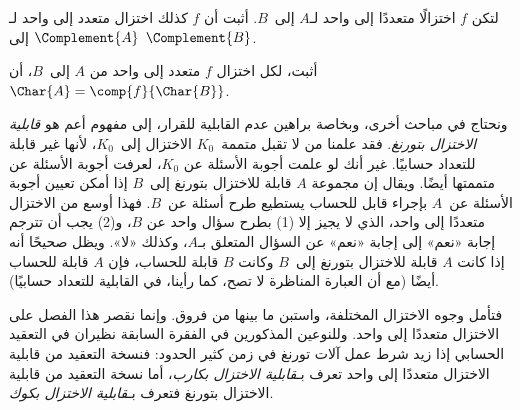 \documentclass[../../../include/open-logic-section]{subfiles}
\begin{document}
\begin{prob}
لتكن $f$ اختزالًا متعددًا إلى واحد لـ$A$ إلى~$B$. أثبت أن $f$ كذلك
اختزال متعدد إلى واحد لـ$\Complement{A}$ إلى $\Complement{B}$.
\end{prob}

\begin{prob}
أثبت، لكل اختزال $f$ متعدد إلى واحد من $A$ إلى~$B$، أن
$\Char{A}=\comp{f}{\Char{B}}$.
\end{prob}

\begin{digress}
ونحتاج في مباحث أخرى، وبخاصة براهين عدم القابلية للقرار، إلى مفهوم
أعم هو \emph{قابلية الاختزال بتورنغ}. فقد علمنا من
 لا تقبل متممة~$K_0$ الاختزال إلى~$K_0$، لأنها
غير قابلة للتعداد حسابيًا. غير أنك لو علمت أجوبة الأسئلة عن
$K_0$، لعرفت أجوبة الأسئلة عن متممتها أيضًا. ويقال إن مجموعة $A$
قابلة للاختزال بتورنغ إلى~$B$ إذا أمكن تعيين أجوبة الأسئلة عن~$A$
بإجراء قابل للحساب يستطيع طرح أسئلة عن~$B$. فهذا أوسع من
الاختزال متعددًا إلى واحد، الذي لا يجيز إلا (1) بطرح سؤال
واحد عن $B$، و(2) يجب أن تترجم إجابة «نعم» إلى إجابة «نعم» عن السؤال
المتعلق بـ$A$، وكذلك «لا». ويظل صحيحًا أنه إذا كانت $A$ قابلة للاختزال
بتورنغ إلى~$B$ وكانت $B$ قابلة للحساب، فإن $A$ قابلة للحساب أيضًا
(مع أن العبارة المناظرة لا تصح، كما رأينا، في القابلية للتعداد حسابيًا).

فتأمل وجوه الاختزال المختلفة، واستبن ما بينها من
فروق. وإنما نقصر هذا الفصل على الاختزال
متعددًا إلى واحد. وللنوعين المذكورين في الفقرة
السابقة نظيران في التعقيد الحسابي إذا زيد شرط عمل
آلات تورنغ في زمن كثير الحدود: فنسخة التعقيد من قابلية الاختزال متعددًا
إلى واحد تعرف بـ\emph{قابلية الاختزال بكارب}، أما نسخة التعقيد من
قابلية الاختزال بتورنغ فتعرف بـ\emph{قابلية الاختزال بكوك}.
\end{digress}
\end{document}
